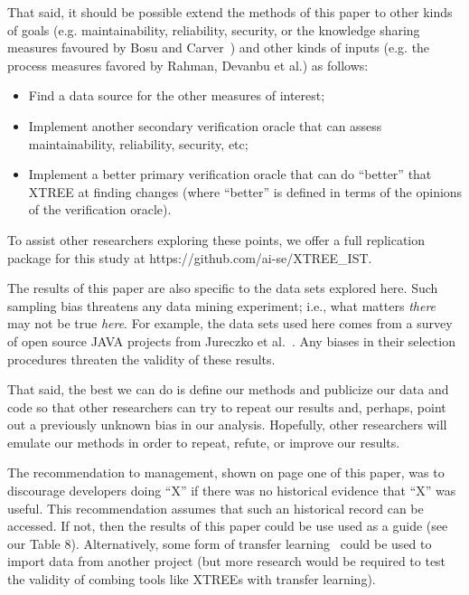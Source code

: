 \documentclass[twocolumn,5p]{elsarticle}
\newcommand{\bi}{\begin{itemize}[leftmargin=0.4cm]}
\newcommand{\ei}{\end{itemize}}
\theoremstyle{break}
\begin{document}
  That said, it should be possible extend the methods of this paper to other kinds of goals (e.g. maintainability, reliability, security,
  or the knowledge sharing measures favoured by Bosu and Carver~\cite{bosu13}) and other kinds of inputs (e.g. the process measures favored by Rahman, Devanbu et al.\cite{Rahman2013})  as follows:
  \bi
  \item Find a data source for the other measures of interest;
  \item Implement another secondary verification oracle that can assess maintainability, reliability, security, etc;
\item Implement a better primary verification oracle that can do ``better'' that XTREE at finding changes (where ``better'' is defined in terms 
of the opinions of the verification oracle).
\ei
To assist other researchers exploring these points, we offer a full replication package for this study at  https://github.com/ai-se/XTREE\_IST.

The results of this paper are also specific to the data sets explored here.
Such sampling bias threatens any data mining experiment; i.e., what matters
{\em there} may not be true {\em here}. For example, the data sets used here comes from a survey of
open source JAVA projects from Jureczko et al.~\cite{jureczko10}. Any biases in their selection procedures
threaten the validity of these results. 

That said,
the best we can do is define our methods and publicize our data and code so that other researchers can
try to repeat our results and, perhaps, point out a previously unknown bias
in our analysis. Hopefully, other researchers will emulate our methods in
order to repeat, refute, or improve our results. 

The recommendation to management, shown on page one of this paper,  was to discourage developers doing ``X'' if there was no historical evidence that ``X'' was useful. 
This recommendation assumes that such an  historical record can be accessed. If not,  then the results of this paper could be use used as a guide (see our Table 8). Alternatively, some form of transfer learning~\cite{Nam15,Jing15,krishna16} could be used to import data from another project (but more research would be required to test the validity of combing tools like XTREEs with transfer learning). 
  

  
  
\end{document}
